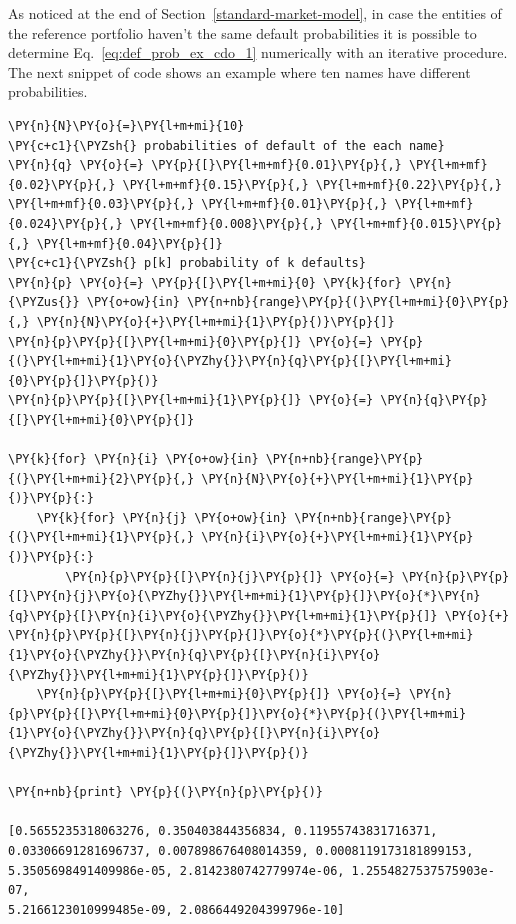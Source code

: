 \begin{attention}
As noticed at the end of Section~\ref{standard-market-model}, in case the entities of the reference portfolio haven't the same default probabilities it is possible to determine Eq.~\ref{eq:def_prob_ex_cdo_1} numerically with an iterative procedure. The next snippet of code shows an example where ten names have different probabilities.

\begin{Verbatim}[commandchars=\\\{\}]
\PY{n}{N}\PY{o}{=}\PY{l+m+mi}{10}
\PY{c+c1}{\PYZsh{} probabilities of default of the each name}
\PY{n}{q} \PY{o}{=} \PY{p}{[}\PY{l+m+mf}{0.01}\PY{p}{,} \PY{l+m+mf}{0.02}\PY{p}{,} \PY{l+m+mf}{0.15}\PY{p}{,} \PY{l+m+mf}{0.22}\PY{p}{,} \PY{l+m+mf}{0.03}\PY{p}{,} \PY{l+m+mf}{0.01}\PY{p}{,} \PY{l+m+mf}{0.024}\PY{p}{,} \PY{l+m+mf}{0.008}\PY{p}{,} \PY{l+m+mf}{0.015}\PY{p}{,} \PY{l+m+mf}{0.04}\PY{p}{]}
\PY{c+c1}{\PYZsh{} p[k] probability of k defaults}
\PY{n}{p} \PY{o}{=} \PY{p}{[}\PY{l+m+mi}{0} \PY{k}{for} \PY{n}{\PYZus{}} \PY{o+ow}{in} \PY{n+nb}{range}\PY{p}{(}\PY{l+m+mi}{0}\PY{p}{,} \PY{n}{N}\PY{o}{+}\PY{l+m+mi}{1}\PY{p}{)}\PY{p}{]}
\PY{n}{p}\PY{p}{[}\PY{l+m+mi}{0}\PY{p}{]} \PY{o}{=} \PY{p}{(}\PY{l+m+mi}{1}\PY{o}{\PYZhy{}}\PY{n}{q}\PY{p}{[}\PY{l+m+mi}{0}\PY{p}{]}\PY{p}{)}
\PY{n}{p}\PY{p}{[}\PY{l+m+mi}{1}\PY{p}{]} \PY{o}{=} \PY{n}{q}\PY{p}{[}\PY{l+m+mi}{0}\PY{p}{]}

\PY{k}{for} \PY{n}{i} \PY{o+ow}{in} \PY{n+nb}{range}\PY{p}{(}\PY{l+m+mi}{2}\PY{p}{,} \PY{n}{N}\PY{o}{+}\PY{l+m+mi}{1}\PY{p}{)}\PY{p}{:}
    \PY{k}{for} \PY{n}{j} \PY{o+ow}{in} \PY{n+nb}{range}\PY{p}{(}\PY{l+m+mi}{1}\PY{p}{,} \PY{n}{i}\PY{o}{+}\PY{l+m+mi}{1}\PY{p}{)}\PY{p}{:}
        \PY{n}{p}\PY{p}{[}\PY{n}{j}\PY{p}{]} \PY{o}{=} \PY{n}{p}\PY{p}{[}\PY{n}{j}\PY{o}{\PYZhy{}}\PY{l+m+mi}{1}\PY{p}{]}\PY{o}{*}\PY{n}{q}\PY{p}{[}\PY{n}{i}\PY{o}{\PYZhy{}}\PY{l+m+mi}{1}\PY{p}{]} \PY{o}{+} \PY{n}{p}\PY{p}{[}\PY{n}{j}\PY{p}{]}\PY{o}{*}\PY{p}{(}\PY{l+m+mi}{1}\PY{o}{\PYZhy{}}\PY{n}{q}\PY{p}{[}\PY{n}{i}\PY{o}{\PYZhy{}}\PY{l+m+mi}{1}\PY{p}{]}\PY{p}{)}
    \PY{n}{p}\PY{p}{[}\PY{l+m+mi}{0}\PY{p}{]} \PY{o}{=} \PY{n}{p}\PY{p}{[}\PY{l+m+mi}{0}\PY{p}{]}\PY{o}{*}\PY{p}{(}\PY{l+m+mi}{1}\PY{o}{\PYZhy{}}\PY{n}{q}\PY{p}{[}\PY{n}{i}\PY{o}{\PYZhy{}}\PY{l+m+mi}{1}\PY{p}{]}\PY{p}{)}
		
\PY{n+nb}{print} \PY{p}{(}\PY{n}{p}\PY{p}{)}

[0.5655235318063276, 0.350403844356834, 0.11955743831716371,
0.03306691281696737, 0.007898676408014359, 0.0008119173181899153,
5.3505698491409986e-05, 2.8142380742779974e-06, 1.2554827537575903e-07,
5.2166123010999485e-09, 2.0866449204399796e-10]
\end{Verbatim}
\end{attention}

